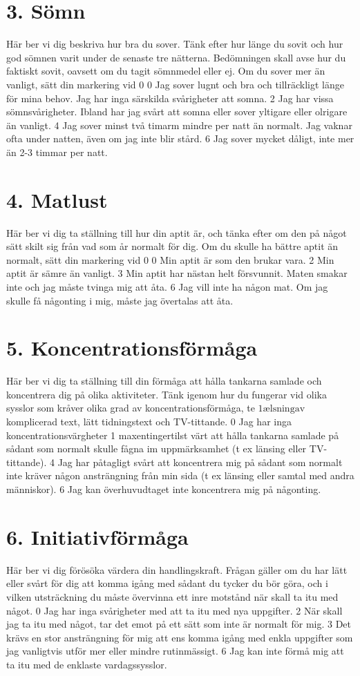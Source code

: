 \section*{3. Sömn}
Här ber vi dig beskriva hur bra du sover. Tänk efter hur länge du sovit och hur god sömnen varit under de senaste tre nätterna. Bedömningen skall avse hur du faktiskt sovit, oavsett om du tagit sömnmedel eller ej. Om du sover mer än vanligt, sätt din markering vid 0
0 Jag sover lugnt och bra och tillräckligt länge för mina behov. Jag har inga särskilda svårigheter att somna.
2 Jag har vissa sömnsvårigheter. Ibland har jag svårt att somna eller sover yltigare eller olrigare än vanligt.
4 Jag sover minst två timarm mindre per natt än normalt. Jag vaknar ofta under natten, även om jag inte blir stård.
6 Jag sover mycket dåligt, inte mer än 2-3 timmar per natt.
\section*{4. Matlust}
Här ber vi dig ta ställning till hur din aptit är, och tänka efter om den på något sätt skilt sig från vad som år normalt för dig. Om du skulle ha bättre aptit än normalt, sätt din markering vid 0
0 Min aptit är som den brukar vara.
2 Min aptit är sämre än vanligt.
3 Min aptit har nästan helt försvunnit. Maten smakar inte och jag måste tvinga mig att åta.
6 Jag vill inte ha någon mat. Om jag skulle få någonting i mig, måste jag övertalas att åta.

\section*{5. Koncentrationsförmåga}
Här ber vi dig ta ställning till din förmåga att hålla tankarna samlade och koncentrera dig på olika aktiviteter. Tänk igenom hur du fungerar vid olika sysslor som kråver olika grad av koncentrationsförmåga, te \(1 \mathrm{ælsning} \mathrm{av}\) komplicerad text, lätt tidningstext och TV-tittande.
0 Jag har inga koncentrationsvärgheter
1 maxentingertilst värt att hålla tankarna samlade på
sådant som normalt skulle fågna im uppmärksamhet (t ex länsing eller TV-tittande).
4 Jag har påtagligt svårt att koncentrera mig på sådant som normalt inte kräver någon ansträngning från min sida (t ex länsing eller samtal med andra människor).
6 Jag kan överhuvudtaget inte koncentrera mig på någonting.
\section*{6. Initiativförmåga}
Här ber vi dig förösöka värdera din handlingskraft. Frågan gäller om du har lätt eller svårt för dig att komma igång med sådant du tycker du bör göra, och i vilken utsträckning du måste övervinna ett inre motstånd när skall ta itu med något.
0 Jag har inga svårigheter med att ta itu med nya uppgifter.
2 När skall jag ta itu med något, tar det emot på ett sätt som inte är normalt för mig.
3 Det krävs en stor ansträngning för mig att ens komma igång med enkla uppgifter som jag vanligtvis utför mer eller mindre rutinmässigt.
6 Jag kan inte förmå mig att ta itu med de enklaste vardagssysslor.
